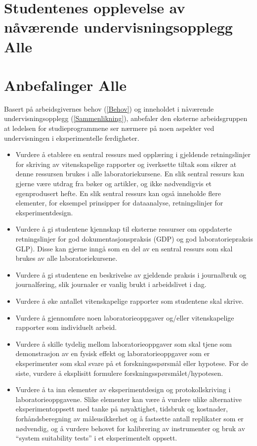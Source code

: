 \documentclass{article}
\begin{document}


\section{Studentenes opplevelse av nåværende undervisningsopplegg {\color{red}Alle}}

\section{Anbefalinger {\color{red}Alle}}
Basert på arbeidsgivernes behov (\cref{Behov}) og inneholdet i nåværende undervisningsopplegg (\cref{Sammenlikning}), anbefaler den eksterne arbeidsgruppen at ledelsen for studieprogrammene ser nærmere på noen aspekter ved undervisningen i eksperimentelle ferdigheter.
\begin{itemize}
  \item Vurdere å etablere en sentral ressurs med opplæring i gjeldende retningslinjer for skriving av vitenskapelige rapporter og iverksette tiltak som sikrer at denne  ressursen brukes i alle laboratoriekursene. En slik sentral ressurs kan gjerne være utdrag fra bøker og artikler, og ikke nødvendigvis et egenprodusert hefte. En slik sentral ressurs kan også inneholde flere elementer, for eksempel prinsipper for dataanalyse, retningslinjer for eksperimentdesign.  
   \item Vurdere å gi studentene kjennskap til eksterne ressurser om oppdaterte retningslinjer for god dokumentasjonspraksis (GDP) og god laboratoriepraksis GLP). Disse kan gjerne inngå som en del av en sentral ressurs som skal brukes av alle laboratoriekursene.
      \item Vurdere å gi studentene en beskrivelse av gjeldende praksis i journalbruk og journalføring, slik journaler er vanlig brukt i arbeidslivet i dag.
  \item Vurdere å øke antallet vitenskapelige rapporter som studentene skal skrive. 
  \item Vurdere å gjennomføre noen laboratorieoppgaver og/eller vitenskapelige rapporter som individuelt arbeid.
  \item Vurdere å skille tydelig mellom laboratorieoppgaver som skal tjene som demonstrasjon av en fysisk effekt og laboratorieoppgaver som er eksperimenter som skal svare på et forskningsspørsmål eller hypotese. For de siste, vurdere å eksplisitt formulere forskningsspørsmålet/hypotesen.
  \item Vurdere å ta inn elementer av eksperimentdesign og protokollskriving i laboratorieoppgavene. Slike elementer kan være å vurdere ulike alternative eksperimentoppsett med tanke på nøyaktighet, tidsbruk og kostnader, forhåndsberegning av måleusikkerhet og å fastsette antall replikater som er nødvendig, og å vurdere behovet for kalibrering av instrumenter og bruk av ``system suitability tests'' i et eksperimentelt oppsett.
\end{itemize}
\end{document}
